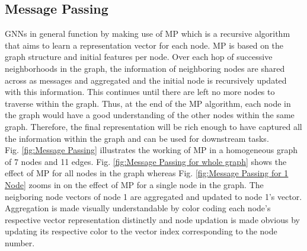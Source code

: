 \documentclass{report} %
\begin{document}
\subsection{Message Passing}\label{subsec:MP}

\ac{GNN}s in general function by making use of \ac{MP} which is a recursive algorithm that aims to learn a representation vector for each node. 
\ac{MP} is based on the graph structure and initial features per node. Over each hop of successive neighborhoods in the graph, the information of neighboring nodes are 
shared across as messages and aggregated and the initial node is recursively updated with this information. This continues until there are left no more nodes to traverse 
within the graph. Thus, at the end of the \ac{MP} algorithm, each node in the graph would have a good understanding of the other nodes within the same graph.
Therefore, the final representation will be rich enough to have captured all the information within the graph and can be used for downstream tasks.\\

Fig. \ref{fig:Message Passing} illustrates the working of \ac{MP} in a homogeneous graph of 7 nodes and 11 edges. Fig. \ref{fig:Message Passing for whole graph} shows 
the effect of \ac{MP} for all nodes in the graph  whereas Fig. \ref{fig:Message Passing for 1 Node} zooms in on the effect of \ac{MP} for a single node in the graph.
The neigboring node vectors of node 1 are aggregated and updated to node 1's vector. Aggregation is made visually understandable by color coding each node's respective 
vector representation distinctly and node updation is made obvious by updating its respective color to the vector index corresponding to the node number. 
\end{document}
